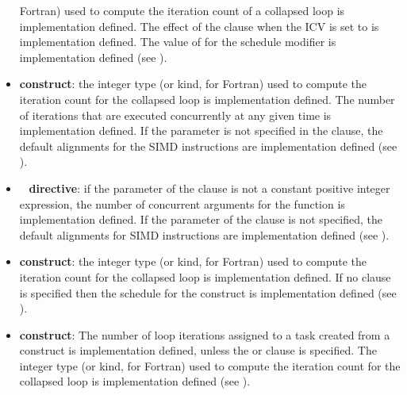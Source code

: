 \begin{itemize}
      Fortran) used to compute the iteration count of a collapsed loop is 
      implementation defined. The effect of the  
      clause when the  ICV is set to  is
      implementation defined. The value of  for the 
       schedule modifier is implementation defined (see 
      ).
\item {} \textbf{construct}: the integer type (or kind, for
      Fortran) used to compute the iteration count for the collapsed loop
      is implementation defined. The number of iterations that are executed 
      concurrently at any given time is implementation defined. If the 
       parameter is not specified in the  clause, 
      the default alignments for the SIMD instructions are implementation 
      defined (see ).
\item {}~ \textbf{directive}: if the parameter of the
       clause is not a constant positive integer expression,
      the number of concurrent arguments for the function is
      implementation defined. If the  parameter of the
       clause is not specified, the default alignments for
      SIMD instructions are implementation defined (see
      ).
\item {} \textbf{construct}: the integer type (or kind, for
      Fortran) used to compute the iteration count for the collapsed loop is
      implementation defined.  If no  clause is specified 
      then the schedule for the  construct is implementation 
      defined (see ).
\item {} \textbf{construct}: The number of loop
      iterations assigned to a task created from a 
      construct is implementation defined, unless the  or
       clause is specified. The integer type (or kind,
      for Fortran) used to compute the iteration count for the collapsed
      loop is implementation defined (see ).



\end{itemize}
